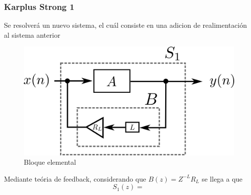 \documentclass[assd_tp2_main.tex]{subfiles}
\begin{document}
\subsubsection{Karplus Strong 1}
Se resolverá un nuevo sistema, el cuál consiste en una adicion de realimentación al sistema anterior
\begin{figure}[H]	
	\centering
	\includegraphics[scale=1]{graficos/bloque2ej5.png}
	\caption{Bloque elemental}
	\label{fig:bloqueElemental}
\end{figure}

Mediante teória de feedback, considerando que $B(z)=Z^{-L}R_L$ se llega a que
\begin{equation}
S_1(z)=\frac{}{}
\end{equation}
\end{document}
